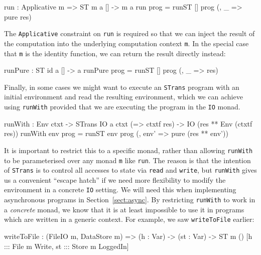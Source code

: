 \small
\begin{code}
run : Applicative m => ST m a [] -> m a
run prog = runST [] prog (\res, _ => pure res)
\end{code}
\normalsize

The \texttt{Applicative} constraint on \texttt{run} is required so that
we can inject the result of the computation into the underlying computation
context \texttt{m}. In the special case that \texttt{m} is the identity
function, we can return the result directly instead:

\small
\begin{code}
runPure : ST id a [] -> a
runPure prog = runST [] prog (\res, _ => res)
\end{code}
\normalsize


Finally, in some cases we might want to execute an \texttt{STrans} program
with an initial environment and read the resulting environment, which we can
achieve using \texttt{runWith} provided that we are executing the program in
the \texttt{IO} monad.

\small
\begin{code}
runWith : Env ctxt -> STrans IO a ctxt (\res => ctxtf res) -> 
          IO (res ** Env (ctxtf res))
runWith env prog = runST env prog (\res, env' => pure (res ** env'))
\end{code}
\normalsize

It is important to restrict this to a specific monad, rather than allowing
\texttt{runWith} to be parameterised over any monad \texttt{m} like
\texttt{run}.
The reason is that the intention of \texttt{STrans} is to control all accesses
to state via \texttt{read} and \texttt{write}, but \texttt{runWith} gives
us a convenient ``escape hatch'' if we need more flexibility to modify the
environment in a concrete
\texttt{IO} setting. We will need this when implementing asynchronous 
programs in Section~\ref{sect:async}. By restricting \texttt{runWith} to work
in a \emph{concrete} monad, we know that it is at least impossible to use it
in programs which are written in a generic context. For example, we saw
\texttt{writeToFile} earlier:

\small
\begin{code}
writeToFile : (FileIO m, DataStore m) => (h : Var) -> (st : Var) ->
              ST m () [h ::: File {m} Write, st ::: Store {m} LoggedIn]
\end{code}
\normalsize

